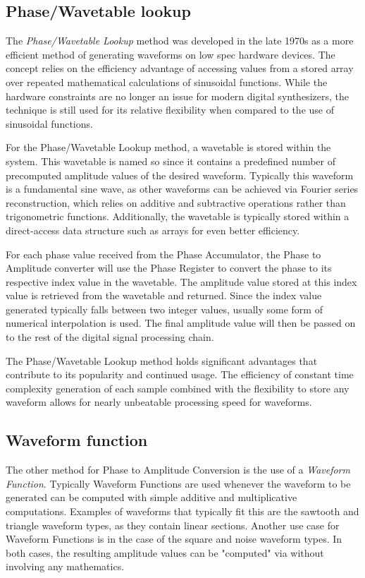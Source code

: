 \documentclass[a4paper,12pt]{report}
\begin{document}
\subsection{Phase/Wavetable lookup}
\label{subsec:phasewavetablelookup}
The \emph{Phase/Wavetable \-Lookup} method was developed in the late 1970s as a more efficient method of generating waveforms on low spec hardware devices. The concept relies on the efficiency advantage of accessing values from a stored array over repeated mathematical calculations of sinusoidal functions. While the hardware constraints are no longer an issue for modern digital synthesizers, the technique is still used for its relative flexibility when compared to the use of sinusoidal functions.

For the Phase/Wavetable Lookup method, a wavetable is stored within the system. This wavetable is named so since it contains a predefined number of precomputed amplitude values of the desired waveform. Typically this waveform is a fundamental sine wave, as other waveforms can be achieved via Fourier series reconstruction, which relies on additive and subtractive operations rather than trigonometric functions. Additionally, the wavetable is typically stored within a direct-access data structure such as arrays for even better efficiency.


For each phase value received from the Phase Accumulator, the Phase to Amplitude converter will use the Phase Register to convert the phase to its respective index value in the wavetable. The amplitude value stored at this index value is retrieved from the wavetable and returned. Since the index value generated typically falls between two integer values, usually some form of numerical interpolation is used. The final amplitude value will then be passed on to the rest of the digital signal processing chain.

The Phase/Wavetable Lookup method holds significant advantages that contribute to its popularity and continued usage. The efficiency of constant time complexity generation of each sample combined with the flexibility to store any waveform allows for nearly unbeatable processing speed for waveforms.

\subsection{Waveform function}
\label{subsec:waveformfunction}
The other method for Phase to Amplitude Conversion is the use of a \emph{Waveform \-Function}. Typically Waveform Functions are used whenever the waveform to be generated can be computed with simple additive and multiplicative computations. Examples of waveforms that typically fit this are the sawtooth and triangle waveform types, as they contain linear sections. Another use case for Waveform Functions is in the case of the square and noise waveform types. In both cases, the resulting amplitude values can be "computed" via without involving any mathematics.
\end{document}
